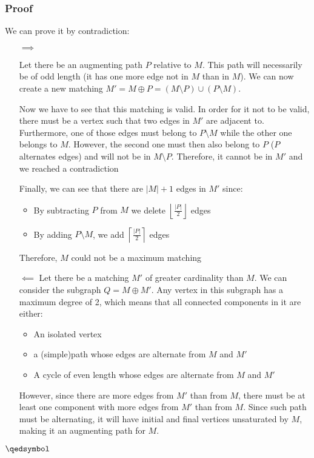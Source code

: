 \subsubsection{Proof}
We can prove it by contradiction:
\begin{itemize}
		\item [$\implies$]

				Let there be an augmenting path $P$ relative to $M$. This path will
				necessarily be of odd length (it has one more edge not in $M$ than
				in $M$). We can now create a new matching 
				$M'=M\oplus P=(M\setminus P) \cup (P\setminus M)$.

				Now we have to see that this matching is valid. In order for it not to
				be valid, there must be a vertex such that two edges in $M'$ are
				adjacent to. Furthermore, one of those edges must belong to 
				$P\setminus M$ while the other one belongs to $M$. However, the second
				one must then also belong to $P$ ($P$ alternates edges) and will not
				be in $M\setminus P$. Therefore, it cannot  be in $M'$ and we reached
				a contradiction

				Finally, we can see that there are $|M|+1$ edges in $M'$ since:
				\begin{itemize}
						\setlength{\itemsep}{0pt}
						\item By subtracting $P$ from $M$ we delete 
								$\left \lfloor\frac {|P|}2\right\rfloor $ edges
						\item By adding $P\setminus M$, we add 
								$\left \lceil\frac {|P|}2\right\rceil $ edges

				\end{itemize}
				Therefore, $M$ could not be a maximum matching
		\item [$\impliedby$]
				Let there be a matching $M'$  of greater cardinality than $M$.
				We can consider the subgraph $Q=M\oplus M'$. Any vertex in 
				this subgraph has a maximum degree of 2, which means that all
				connected components in it are either:
				\begin{itemize}
						\setlength{\itemsep}{0pt}
						\item An isolated vertex
						\item a (simple)path whose edges are alternate from $M$ 
								and $M'$
						\item A cycle of even length whose edges are 
								alternate from $M$ and $M'$
				\end{itemize}
				However, since there are more edges from $M'$ than from $M$, 
				there must be at least one component with more edges from $M'$
				than from $M$. Since such path must be alternating, it will
				have initial and final vertices unsaturated by $M$, making
				it an augmenting path for $M$.
\end{itemize}
\hfill $\qedsymbol$

